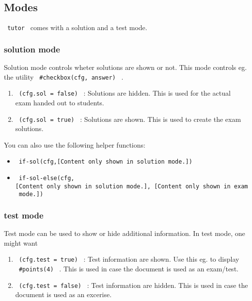 \subsection{Modes}\label{modes}

\texttt{\ tutor\ } comes with a solution and a test mode.

\subsubsection{solution mode}\label{solution-mode}

Solution mode controls wheter solutions are shown or not. This mode
controls eg. the utility \texttt{\ \#checkbox(cfg,\ answer)\ } .

\begin{enumerate}
\tightlist
\item
  \texttt{\ (cfg.sol\ =\ false)\ } : Solutions are hidden. This is used
  for the actual exam handed out to students.
\item
  \texttt{\ (cfg.sol\ =\ true)\ } : Solutions are shown. This is used to
  create the exam solutions.
\end{enumerate}

You can also use the following helper functions:

\begin{itemize}
\tightlist
\item
  \texttt{\ if-sol(cfg,{[}Content\ only\ shown\ in\ solution\ mode.{]})\ }
\item
  \texttt{\ if-sol-else(cfg,{[}Content\ only\ shown\ in\ solution\ mode.{]},\ {[}Content\ only\ shown\ in\ exam\ mode.{]})\ }
\end{itemize}

\subsubsection{test mode}\label{test-mode}

Test mode can be used to show or hide additional information. In test
mode, one might want

\begin{enumerate}
\item
  \texttt{\ (cfg.test\ =\ true)\ } : Test information are shown. Use
  this eg. to display \texttt{\ \#points(4)\ } . This is used in case
  the document is used as an exam/test.
\item
  \texttt{\ (cfg.test\ =\ false)\ } : Test information are hidden. This
  is used in case the document is used as an excerise.
\end{enumerate}

